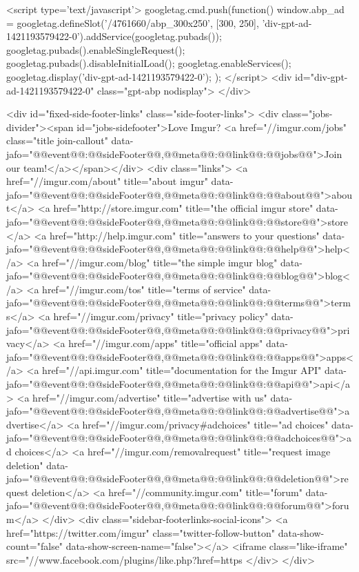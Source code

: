     
    
    <script type='text/javascript'>
googletag.cmd.push(function() {
    window.abp_ad = googletag.defineSlot('/4761660/abp_300x250', [300, 250], 'div-gpt-ad-1421193579422-0').addService(googletag.pubads());
    googletag.pubads().enableSingleRequest();
    googletag.pubads().disableInitialLoad();
    googletag.enableServices();
    googletag.display('div-gpt-ad-1421193579422-0');
});
</script>
<div id="div-gpt-ad-1421193579422-0" class="gpt-abp nodisplay">
</div>




            

            <div id="fixed-side-footer-links" class="side-footer-links">
    <div class="jobs-divider"><span id="jobs-sidefooter">Love Imgur? <a href="//imgur.com/jobs" class="title join-callout" data-jafo="{@@event@@:@@sideFooter@@,@@meta@@:{@@link@@:@@jobs@@}}">Join our team!</a></span></div>
    <div class="links">
        <a href="//imgur.com/about" title="about imgur" data-jafo="{@@event@@:@@sideFooter@@,@@meta@@:{@@link@@:@@about@@}}">about</a>
        <a href="http://store.imgur.com" title="the official imgur store" data-jafo="{@@event@@:@@sideFooter@@,@@meta@@:{@@link@@:@@store@@}}">store</a>
        <a href="http://help.imgur.com" title="answers to your questions" data-jafo="{@@event@@:@@sideFooter@@,@@meta@@:{@@link@@:@@help@@}}">help</a>
        <a href="//imgur.com/blog" title="the simple imgur blog" data-jafo="{@@event@@:@@sideFooter@@,@@meta@@:{@@link@@:@@blog@@}}">blog</a>
        <a href="//imgur.com/tos" title="terms of service" data-jafo="{@@event@@:@@sideFooter@@,@@meta@@:{@@link@@:@@terms@@}}">terms</a>
        <a href="//imgur.com/privacy" title="privacy policy" data-jafo="{@@event@@:@@sideFooter@@,@@meta@@:{@@link@@:@@privacy@@}}">privacy</a>
        <a href="//imgur.com/apps" title="official apps" data-jafo="{@@event@@:@@sideFooter@@,@@meta@@:{@@link@@:@@apps@@}}">apps</a>
        <a href="//api.imgur.com" title="documentation for the Imgur API" data-jafo="{@@event@@:@@sideFooter@@,@@meta@@:{@@link@@:@@api@@}}">api</a>
        <a href="//imgur.com/advertise" title="advertise with us" data-jafo="{@@event@@:@@sideFooter@@,@@meta@@:{@@link@@:@@advertise@@}}">advertise</a>
        <a href="//imgur.com/privacy#adchoices" title="ad choices" data-jafo="{@@event@@:@@sideFooter@@,@@meta@@:{@@link@@:@@adchoices@@}}">ad choices</a>
        <a href="//imgur.com/removalrequest" title="request image deletion" data-jafo="{@@event@@:@@sideFooter@@,@@meta@@:{@@link@@:@@deletion@@}}">request deletion</a>
        <a href="//community.imgur.com" title="forum" data-jafo="{@@event@@:@@sideFooter@@,@@meta@@:{@@link@@:@@forum@@}}">forum</a>
    </div>
    <div class="sidebar-footerlinks-social-icons">
        <a href="https://twitter.com/imgur" class="twitter-follow-button" data-show-count="false" data-show-screen-name="false"></a>
        <iframe class="like-iframe" src="//www.facebook.com/plugins/like.php?href=https%
    </div>
</div>

